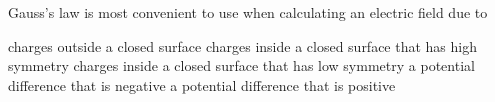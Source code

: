 \documentclass{../../oss-classkick-exam}
\begin{document}
\begin{multicols*}{2}
\begin{questions}
    \question Gauss's law is most convenient to use when calculating an electric
    field due to
    \begin{choices}
      \choice charges outside a closed surface
      \choice charges inside a closed surface that has high symmetry
      \choice charges inside a closed surface that has low symmetry
      \choice a potential difference that is negative
      \choice a potential difference that is positive
    \end{choices}

%
%

\end{questions}
\end{multicols*}
\end{document}
